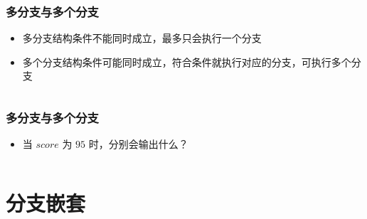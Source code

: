 
\begin{frame}[fragile]
    \frametitle{多分支与多个分支}

    \begin{itemize}
        \item<1-> 多分支结构条件不能同时成立，最多只会执行一个分支
        \item<2-> 多个分支结构条件可能同时成立，符合条件就执行对应的分支，可执行多个分支
    \end{itemize}

    \begin{columns}


    \end{columns}
\end{frame}

\begin{frame}[fragile]
    \frametitle{多分支与多个分支}

    \begin{itemize}
        \item 当 $score$ 为 $95$ 时，分别会输出什么？
    \end{itemize}

    \begin{columns}[T]

        

        
    \end{columns}
\end{frame}


\section{分支嵌套}

